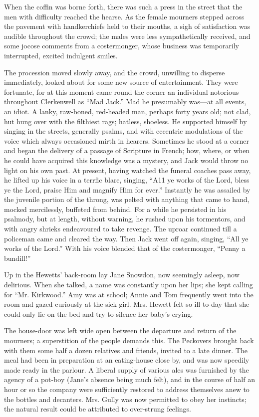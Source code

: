 When the coffin was borne forth, there was such a press in the street
that the men with difficulty reached the hearse. As the female mourners
stepped across the pavement with handkerchiefs held to their mouths, a
sigh of satisfaction was audible throughout the crowd; the males were
less sympathetically received, and some jocose comments from a
costermonger, whose business was temporarily interrupted, excited
indulgent smiles.

The procession moved slowly away, and the crowd, unwilling to disperse
immediately, looked about for some new source of entertainment. They
were fortunate, for at this moment came round the corner an individual
notorious throughout Clerkenwell as ``Mad Jack.'' Mad he presumably
was---at all events, an idiot. A lanky, raw-boned,
{\protect\hypertarget{102}{}{}}red-headed man, perhaps forty years old;
not clad, hut hung over with the filthiest rags; hatless, shoeless. He
supported himself by singing in the streets, generally psalms, and with
eccentric modulations of the voice which always occasioned mirth in
hearers. Sometimes he stood at a corner and began the delivery of a
passage of Scripture in French; how, where, or when he could have
acquired this knowledge was a mystery, and Jack would throw no light on
his own past. At present, having watched the funeral coaches pass away,
he lifted up his voice in a terrfic blare, singing, ``A11 ye works of
the Lord, bless ye the Lord, praise Him and magnify Him for ever.''
Instantly he was assailed by the juvenile portion of the throng, was
pelted with anything that came to hand, mocked mercilessly, buffeted
from behind. For a while he persisted in his psalmody, but at length,
without warning, he rushed upon his tormentors, and with angry shrieks
endeavoured to take revenge. The uproar continued till a policeman came
and cleared {\protect\hypertarget{103}{}{}}the way. Then Jack went off
again, singing, ``All ye works of the Lord.'' With his voice blended
that of the costermonger, ``Penny a bundill!''

Up in the Hewetts' back-room lay Jane Snowdon, now seemingly asleep, now
delirious. When she talked, a name was constantly upon her lips; she
kept calling for ``Mr. Kirkwood.'' Amy was at school; Annie and Tom
frequently went into the room and gazed curiously at the sick girl. Mrs.
Hewett felt so ill to-day that she could only lie on the bed and try to
silence her baby's crying.

The house-door was left wide open between the departure and return of
the mourners; a superstition of the people demands this. The Peckovers
brought back with them some half a dozen relatives and friends, invited
to a late dinner. The meal had been in preparation at an eating-house
close by, and was now speedily made ready in the parlour. A liberal
supply of various ales was furnished by the agency of a pot-boy (Jane's
absence being {\protect\hypertarget{104}{}{}}much felt), and in the
course of half an hour or so the company were sufficiently restored to
address themselves anew to the bottles and decanters. Mrs. Gully was now
permitted to obey her instincts; the natural result could be attributed
to over-strung feelings.

